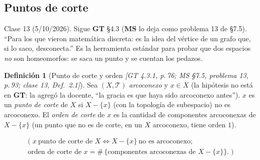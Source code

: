 \documentclass[11pt,a4paper]{article}
\newcommand{\lgc}[1]{\par\vspace{-3pt}\begin{gather*}\big(\;#1\;\big)\end{gather*}\vspace{-6pt}}
\newcommand{\figtit}[1]{\par\vspace{2pt}{\footnotesize\itshape #1}\par}
\theoremstyle{definition}
\newtheorem{definicion}{Definición}[section]
\theoremstyle{plain}
\newcommand{\fnt}[1]{{\normalfont\small\itshape\color{gray!150!black}[#1]}}
\newcommand{\tp}{\mathcal{T}}
\begin{document}
\begin{figure}[ht]
\centering
{}
\figtit{Figura 25. La escalera de GT 4.2.8(4): rectas verticales $A_n$ en $x=1/n$ unidas por peldaños $B_n$ a altura $n$ (azul), más el eje $A_0$ (rojo). Para ir de $H$ (azul) a $A_0$ habría que subir infinitos peldaños: ningún camino, que es acotado, lo logra.}
\end{figure}

\subsection{Puntos de corte}\label{cc:corte}

\noindent Clase 13 (5/10/2026). Sigue \textbf{GT} \S4.3 (\textbf{MS} lo deja como problema 13 de \S7.5). ``Para los que vieron matemática discreta: es la idea del vértice de un grafo que, si lo saco, desconecta.'' Es la herramienta estándar para probar que dos espacios \emph{no} son homeomorfos: se saca un punto y se cuentan los pedazos.

\begin{definicion}[Punto de corte y orden \fnt{GT 4.3.1, p.\,76; MS \S7.5, problema 13, p.\,93; clase 13, Def.\ 2.1}]\label{cc:defcorte}
Sea $(X,\tp)$ \emph{arcoconexo} y $x\in X$ (la hipótesis no está en \textbf{GT}: la agregó la docente, ``la gracia es que haya sido arcoconexo antes''). $x$ es un \emph{punto de corte} de $X$ si $X-\{x\}$ (con la topología de subespacio) no es arcoconexo. El \emph{orden de corte} de $x$ es la cantidad de componentes arcoconexas de $X-\{x\}$ (un punto que no es de corte, en un $X$ arcoconexo, tiene orden $1$).
\lgc{x\ \text{punto de corte de } X\iff X-\{x\}\ \text{no es arcoconexo};\\
\text{orden de corte de } x=\#\,\{\text{componentes arcoconexas de } X-\{x\}\}.}
\end{definicion}
\end{document}
